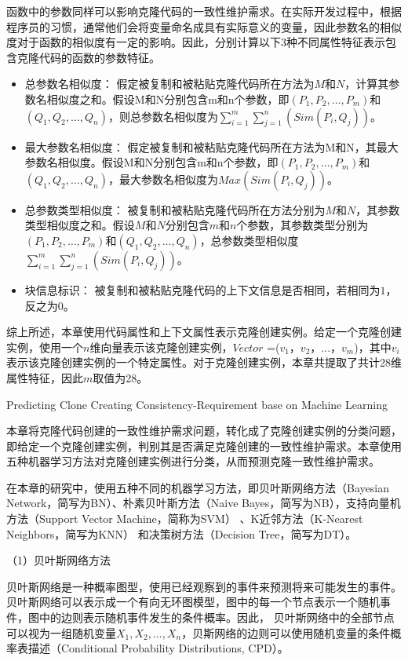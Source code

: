 函数中的参数同样可以影响克隆代码的一致性维护需求。在实际开发过程中，根据程序员的习惯，通常他们会将变量命名成具有实际意义的变量，因此参数名的相似度对于函数的相似度有一定的影响。因此，分别计算以下3种不同属性特征表示包含克隆代码的函数的参数特征。
\begin{itemize}
\item
总参数名相似度：
假定被复制和被粘贴克隆代码所在方法为$M$和$N$，计算其参数名相似度之和。假设M和N分别包含m和n个参数，即$(P_1,P_2,…,P_m)$和$(Q_1,Q_2,…,Q_n)$，则总参数名相似度为$\mathit{\sum_{i=1}^m \sum_{j=1}^n (Sim(P_i,Q_j))}$。
\item
最大参数名相似度：
假定被复制和被粘贴克隆代码所在方法为M和N，其最大参数名相似度。假设M和N分别包含m和n个参数，即$(P_1,P_2,…,P_m)$和$(Q_1,Q_2,…,Q_n)$，最大参数名相似度为$\mathit{Max (Sim(P_i,Q_j))}$。
\item 
总参数类型相似度：
被复制和被粘贴克隆代码所在方法分别为$M$和$N$，其参数类型相似度之和。假设$M$和$N$分别包含$m$和$n$个参数，其参数类型分别为$(P_1,P_2,…,P_m)$和$(Q_1,Q_2,…,Q_n)$，总参数类型相似度$\mathit{\sum_{i=1}^m \sum_{j=1}^n (Sim(P_i,Q_j))}$。
\item
块信息标识：
被复制和被粘贴克隆代码的上下文信息是否相同，若相同为$1$，反之为$0$。
\end{itemize}

综上所述，本章使用代码属性和上下文属性表示克隆创建实例。给定一个克隆创建实例，使用一个$n$维向量表示该克隆创建实例，{$Vector$ ={($v_1$，$v_2$，$...$，$v_m$)}}，其中$v_i$表示该克隆创建实例的一个特定属性。对于克隆创建实例，本章共提取了共计28维属性特征，因此$m$取值为28。
%

{Predicting Clone Creating Consistency-Requirement base on Machine Learning}
\label{lab-machine}

本章将克隆代码创建的一致性维护需求问题，转化成了克隆创建实例的分类问题，即给定一个克隆创建实例，判别其是否满足克隆创建的一致性维护需求。本章使用五种机器学习方法对克隆创建实例进行分类，从而预测克隆一致性维护需求。

在本章的研究中，使用五种不同的机器学习方法，即贝叶斯网络方法（Bayesian Network，简写为BN）\cite{friedman1997bayesian,pearl1985bayesian}、朴素贝叶斯方法（Naive Bayes，简写为NB）\cite{john1995estimating}，支持向量机方法（Support Vector Machine，简称为SVM）\cite{platt199912} 、K近邻方法（K-Nearest Neighbors，简写为KNN） \cite{aha1991instance}和决策树方法（Decision Tree，简写为DT）\cite{quinlan2014c4}。

（1）贝叶斯网络方法

贝叶斯网络是一种概率图型，使用已经观察到的事件来预测将来可能发生的事件\cite{friedman1997bayesian}。贝叶斯网络可以表示成一个有向无环图模型，图中的每一个节点表示一个随机事件，图中的边则表示随机事件发生的条件概率。因此， 贝叶斯网络中的全部节点可以视为一组随机变量{$X_{1},X_{2},...,X_{n}$}，贝斯网络的边则可以使用随机变量的条件概率表描述（Conditional Probability Distributions, CPD）。

